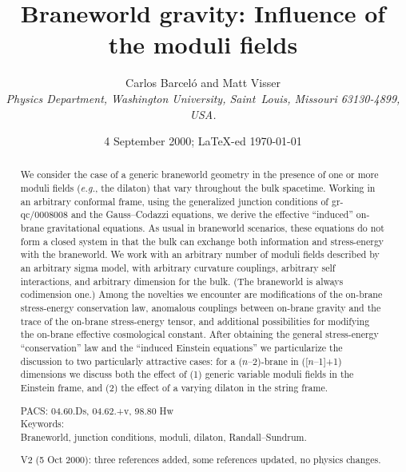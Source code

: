 \documentclass[a4paper,10pt]{article}
\begin{document}
   
\def\Barcelo{Barcel\'o}
\title{\Large 
\bf Braneworld gravity: Influence of the moduli fields}
\author{Carlos {\Barcelo} and Matt Visser\\[2mm]
{\small \it 
Physics Department, Washington University, 
Saint~Louis, Missouri 63130-4899, USA.}}
\date{{\small 4 September 2000; \LaTeX-ed \today}}
\maketitle
\begin{abstract}
We consider the case of a generic braneworld geometry in the presence
of one or more moduli fields ({\emph{e.g.}}, the dilaton) that vary
throughout the bulk spacetime. Working in an arbitrary conformal
frame, using the generalized junction conditions of gr-qc/0008008 and
the Gauss--Codazzi equations, we derive the effective ``induced''
on-brane gravitational equations.  As usual in braneworld scenarios,
these equations do not form a closed system in that the bulk can
exchange both information and stress-energy with the braneworld.  We
work with an arbitrary number of moduli fields described by an
arbitrary sigma model, with arbitrary curvature couplings, arbitrary
self interactions, and arbitrary dimension for the bulk. (The
braneworld is always codimension one.) Among the novelties we
encounter are modifications of the on-brane stress-energy conservation
law, anomalous couplings between on-brane gravity and the trace of the
on-brane stress-energy tensor, and additional possibilities for
modifying the on-brane effective cosmological constant. After
obtaining the general stress-energy ``conservation'' law and the
``induced Einstein equations'' we particularize the discussion to two
particularly attractive cases: for a ($n$--2)-brane in ([$n$--1]+1)
dimensions we discuss both the effect of (1) generic variable moduli
fields in the Einstein frame, and (2) the effect of a varying dilaton
in the string frame.
\vspace*{5mm}

\noindent
PACS: 04.60.Ds, 04.62.+v, 98.80 Hw\\
Keywords: \\
Braneworld, junction conditions, moduli, dilaton, Randall--Sundrum.
\vspace*{5mm}

\noindent
V2 (5 Oct 2000): three references added, some references updated, no physics changes.
\end{abstract}
\end{document}
